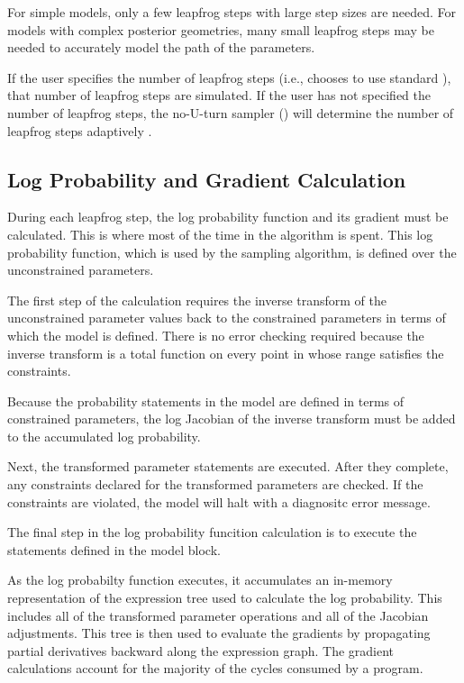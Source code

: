 For simple models, only a few leapfrog steps with large step sizes are
needed.  For models with complex posterior geometries, many small
leapfrog steps may be needed to accurately model the path of the
parameters.

If the user specifies the number of leapfrog steps (i.e., chooses to
use standard \HMC), that number of leapfrog steps are simulated.  If
the user has not specified the number of leapfrog steps, the no-U-turn
sampler (\NUTS) will determine the number of leapfrog steps adaptively
\citep{Hoffman-Gelman:2011}.

\subsection{Log Probability and Gradient Calculation}

During each leapfrog step, the log probability function and its
gradient must be calculated.  This is where most of the time in the
\Stan algorithm is spent.  This log probability function, which is
used by the sampling algorithm, is defined over the unconstrained
parameters.

The first step of the calculation requires the inverse transform of
the unconstrained parameter values back to the constrained parameters
in terms of which the model is defined.  There is no error checking
required because the inverse transform is a total function on every point
in whose range satisfies the constraints.

Because the probability statements in the model are defined in terms
of constrained parameters, the log Jacobian of the inverse transform
must be added to the accumulated log probability.

Next, the transformed parameter statements are executed.  After they
complete, any constraints declared for the transformed parameters are
checked.  If the constraints are violated, the model will halt with a
diagnositc error message.

The final step in the log probability funcition calculation is to
execute the statements defined in the model block.  

As the log probabilty function executes, it accumulates an in-memory
representation of the expression tree used to calculate the log
probability.  This includes all of the transformed parameter
operations and all of the Jacobian adjustments.  This tree is then
used to evaluate the gradients by propagating partial derivatives
backward along the expression graph.  The gradient calculations
account for the majority of the cycles consumed by a \Stan program.

